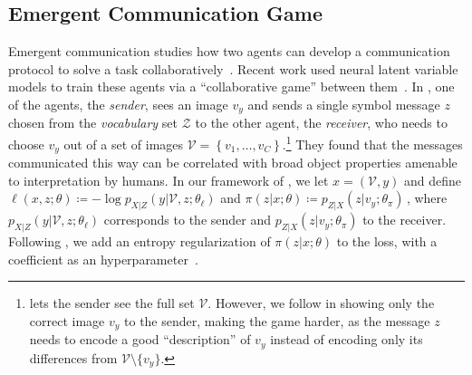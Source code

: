\subsection{Emergent Communication Game}\label{sec:comm}

\noindent Emergent communication studies how two agents can develop a
communication protocol to solve a task
collaboratively~\citep{kirby2002natural}. Recent work used neural
latent variable models to train these agents via a ``collaborative
game'' between
them~\citep{Lazaridou2017,Havrylov2017,
    jorge2016learning, foerster2016learning, sukhbaatar2016learning}. In
\citet{Lazaridou2017}, one of the agents, the \emph{sender}, sees an
image $v_y$ and sends a single symbol message $z$ chosen from the \emph{vocabulary} set
$\mathcal{Z}$ to the other agent, the
\emph{receiver}, who needs to choose $v_y$ out of
a set of images $\mathcal{V} = \left\{ v_1, \dots, v_C
    \right\}$.\footnote{\citet{Lazaridou2017} lets the sender see the
    full set $\mathcal{V}$. However, we follow \citet{Havrylov2017}
    in showing only the correct image $v_y$ to the sender, making the
    game harder, as the message $z$ needs to encode a good
    ``description'' of $v_y$ instead of encoding only
    its differences from $\mathcal{V}\setminus \{v_y\}$.} They found that
the messages communicated this way can be correlated with broad
object properties amenable to interpretation by humans. In our
framework of , we let $x = (\mathcal{V}, y)$ and define
$\ell (x, z; \theta) \coloneqq -\log p_{X|Z}(y |\mathcal{V}, z; \theta_\ell)$
and
$\pi (z |x; \theta) \coloneqq p_{Z|X}(z |v_y; \theta_\pi)\,$,
where
$p_{X|Z}(y |\mathcal{V}, z; \theta_\ell)$ corresponds to the sender and
$p_{Z|X}(z |v_y; \theta_\pi)$ to the receiver. Following
\citet{Lazaridou2017}, we add an entropy regularization of $\pi (z
    |x; \theta)$ to the loss, with a coefficient as an
hyperparameter~\citep{Mnih2016}.

